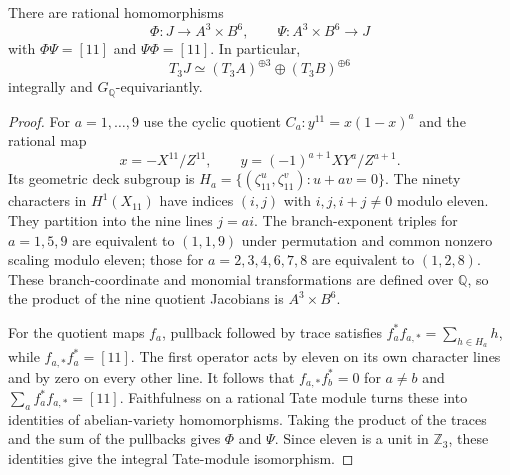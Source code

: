 \begin{lemma}
\label{lem:eleven-integral-isogeny}
There are rational homomorphisms
\[
 \Phi:J\longrightarrow A^3\times B^6,\qquad
 \Psi:A^3\times B^6\longrightarrow J
\]
with $\Phi\Psi=[11]$ and $\Psi\Phi=[11]$.  In particular,
\[
 T_3J\simeq(T_3A)^{\oplus3}\oplus(T_3B)^{\oplus6}
\]
integrally and $G_{\mathbb Q}$-equivariantly.
\end{lemma}
\begin{proof}
For $a=1,\ldots,9$ use the cyclic quotient
$C_a:y^{11}=x(1-x)^a$ and the rational map
\[
 x=-X^{11}/Z^{11},\qquad
 y=(-1)^{a+1}XY^a/Z^{a+1}.
\]
Its geometric deck subgroup is
$H_a=\{(\zeta_{11}^u,\zeta_{11}^v):u+av=0\}$.
The ninety characters in $H^1(X_{11})$ have indices
$(i,j)$ with $i,j,i+j\ne0$ modulo eleven.  They partition
into the nine lines $j=ai$.  The branch-exponent triples
for $a=1,5,9$ are equivalent to $(1,1,9)$ under permutation
and common nonzero scaling modulo eleven; those for
$a=2,3,4,6,7,8$ are equivalent to $(1,2,8)$.
These branch-coordinate and monomial transformations are defined
over $\mathbb Q$, so the product of the nine quotient Jacobians
is $A^3\times B^6$.

For the quotient maps $f_a$, pullback followed by trace satisfies
$f_a^*f_{a,*}=\sum_{h\in H_a}h$, while
$f_{a,*}f_a^*=[11]$.  The first operator acts by eleven
on its own character lines and by zero on every other line.
It follows that $f_{a,*}f_b^*=0$ for $a\ne b$ and
$\sum_a f_a^*f_{a,*}=[11]$.  Faithfulness on a rational Tate
module turns these into identities of abelian-variety
homomorphisms.  Taking the product of the traces and the
sum of the pullbacks gives $\Phi$ and $\Psi$.
Since eleven is a unit in $\mathbb Z_3$, these identities
give the integral Tate-module isomorphism.
\end{proof}


